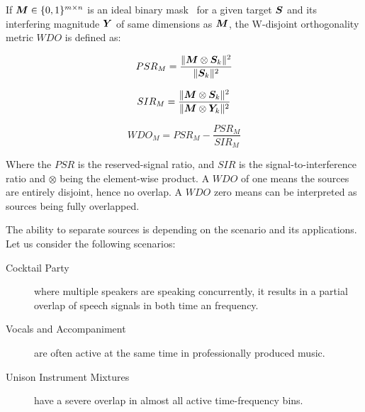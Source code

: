 If \({\bm{M}} \in \{0, 1\}^{m\times n}\) is an ideal binary mask~\cite{wang05} for a given target \({\bm{S}}\) and its interfering magnitude \({\bm{Y}}\) of same dimensions as \({\bm{M}}\), the W-disjoint orthogonality metric \(WDO\) is defined as:

\begin{equation}
    PSR_{M} = \frac{\|{\bm{M}} \otimes {\bm{S}}_{k}\|^{2}}{\|{\bm{S}}_{k}\|^{2}}
\end{equation}

\begin{equation}
    SIR_{M}=\frac{\|{\bm{M}} \otimes {\bm{S}}_{k}\|^{2}}{\|{\bm{M}} \otimes {\bm{Y}}_{k}\|^{2}} 
\end{equation}

\begin{equation}
    WDO_{M} = PSR_{M} - \frac{PSR_{M}}{SIR_{M}}
\end{equation}

Where the \(PSR\) is the reserved-signal ratio, and \(SIR\) is the signal-to-interference ratio and \(\otimes\) being the element-wise product.
A \(WDO\) of one means the sources are entirely disjoint, hence no overlap.
A \(WDO\) zero means can be interpreted as sources being fully overlapped.
\par
The ability to separate sources is depending on the scenario and its applications.
Let us consider the following scenarios:

\begin{description}
  \item[Cocktail Party] where multiple speakers are speaking concurrently, it results in a partial overlap of speech signals in both time an frequency. 
  \item[Vocals and Accompaniment] are often active at the same time in professionally produced music.
  \item[Unison Instrument Mixtures] have a severe overlap in almost all active time-frequency bins.
\end{description}

